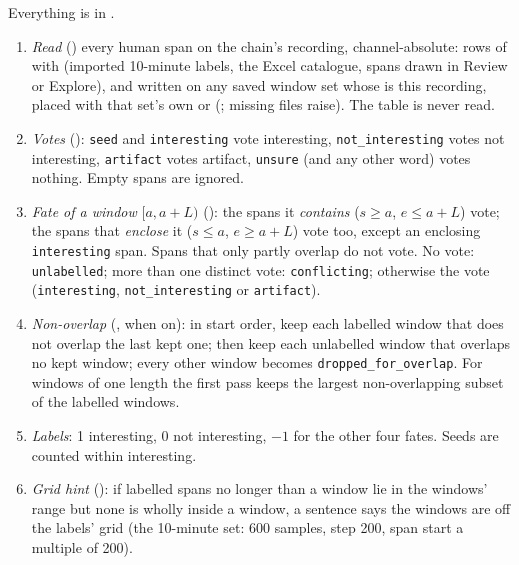 Everything is in .
\begin{enumerate}
\item \emph{Read} () every human span on the chain's recording, channel-absolute:
  rows of  with  (imported 10-minute labels, the Excel
  catalogue, spans drawn in Review or Explore), and  written on any saved
  window set whose  is this recording, placed with that set's own
   or  (; missing files raise).
  The  table is never read.
\item \emph{Votes} (): \texttt{seed} and \texttt{interesting} vote interesting,
  \texttt{not\_interesting} votes not interesting, \texttt{artifact} votes artifact,
  \texttt{unsure} (and any other word) votes nothing. Empty spans are ignored.
\item \emph{Fate of a window} $[a, a+L)$ (): the spans it \emph{contains}
  ($s \geq a$, $e \leq a+L$) vote; the spans that \emph{enclose} it ($s \leq a$, $e \geq a+L$) vote
  too, except an enclosing \texttt{interesting} span. Spans that only partly overlap do not vote.
  No vote: \texttt{unlabelled}; more than one distinct vote: \texttt{conflicting}; otherwise the
  vote (\texttt{interesting}, \texttt{not\_interesting} or \texttt{artifact}).
\item \emph{Non-overlap} (, when on): in start order, keep each labelled
  window that does not overlap the last kept one; then keep each unlabelled window that overlaps no
  kept window; every other window becomes \texttt{dropped\_for\_overlap}. For windows of one length
  the first pass keeps the largest non-overlapping subset of the labelled windows.
\item \emph{Labels}: 1 interesting, 0 not interesting, $-1$ for the other four fates. Seeds are
  counted within interesting.
\item \emph{Grid hint} (): if labelled spans no longer than a window lie in the
  windows' range but none is wholly inside a window, a sentence says the windows are off the labels'
  grid (the 10-minute set: 600 samples, step 200, span start a multiple of 200).
\end{enumerate}

